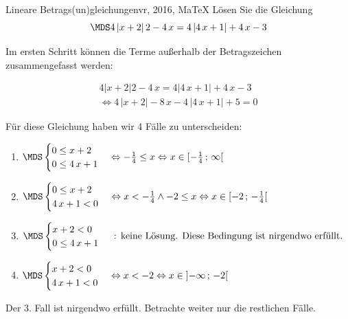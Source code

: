  \providecommand{\MoIl}[1][]{\mbox{}#1]\mathopen{}} 
 \providecommand{\MoIr}[1][]{#1[\mbox{}} 
 \providecommand{\MIntvlSep}{;} 
 \providecommand{\MElSetSep}{\, ; \, } 
 \begin{MAufgabe}{Lineare Betrags(un)gleichungen}{vr, 2016, MaTeX}
L\"osen Sie die Gleichung
$$
 \MDS 4\left| x + 2 \right|2 - 4\, x= 4 \left| 4\, x + 1 \right| +4\, x - 3
$$  

\ifLsg\MLoesung

Im ersten Schritt k\"onnen die Terme au\ss{}erhalb der Betragszeichen zusammengefasst werden:

\begin{align*} 
 4\left| x + 2 \right|2 - 4\, x= 4 \left| 4\, x + 1 \right| +4\, x - 3\\ 
\Leftrightarrow4\, \left|x + 2\right| - 8\, x - 4\, \left|4\, x + 1\right| + 5= 0 
 \end{align*}

F\"ur diese Gleichung haben wir 4 F\"alle zu unterscheiden: 
\begin{enumerate}
\item $ \MDS 
\begin{cases} 
 0 \leq x + 2\\ 
0 \leq 4\, x + 1
 \end{cases}
\Leftrightarrow - \frac{1}{4} \leq x\Leftrightarrow x \in [ - \frac{1}{4} \, \MIntvlSep \, \infty\MoIr $ 
\item $ \MDS 
\begin{cases} 
 0 \leq x + 2\\ 
4\, x + 1 < 0
 \end{cases}
\Leftrightarrow x < - \frac{1}{4} \wedge -2 \leq x\Leftrightarrow x \in [ -2 \, \MIntvlSep \, - \frac{1}{4}\MoIr $ 
\item $ \MDS 
\begin{cases} 
 x + 2 < 0\\ 
0 \leq 4\, x + 1
 \end{cases}
 \mbox{ : keine L\"osung. Diese Bedingung ist nirgendwo erf\"ullt.}$ 
\item $ \MDS 
\begin{cases} 
 x + 2 < 0\\ 
4\, x + 1 < 0
 \end{cases}
\Leftrightarrow x < -2\Leftrightarrow x \in \MoIl  -\infty \, \MIntvlSep \, -2\MoIr $ 
\end{enumerate} 
Der 3. Fall ist nirgendwo erf\"ullt. Betrachte weiter nur die restlichen F\"alle.
 

\end{MAufgabe}

